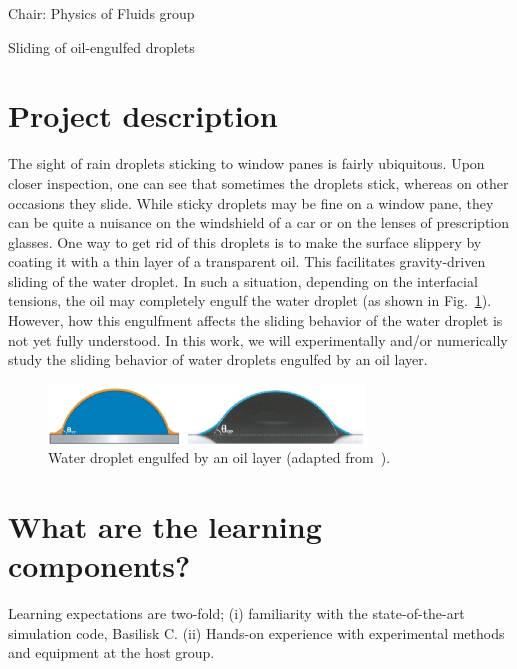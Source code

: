 \documentclass[a4paper,10pt]{article}
\begin{document}
 
\thispagestyle{empty} %

\noindent Chair: Physics of Fluids group
\begin{center}
 \begin{LARGE}
 Sliding of oil-engulfed droplets
 \end{LARGE}
\end{center}

\section*{Project description}
The sight of rain droplets sticking to window panes is fairly ubiquitous. Upon closer inspection, one can see that sometimes the droplets stick, whereas on other occasions they slide. While sticky droplets may be fine on a window pane, they can be quite a nuisance on the windshield of a car or on the lenses of prescription glasses. One way to get rid of this droplets is to make the surface slippery by coating it with a thin layer of a transparent oil. This facilitates gravity-driven sliding of the water droplet. In such a situation, depending on the interfacial tensions, the oil may completely engulf the water droplet (as shown in Fig.~\ref{figure}). However, how this engulfment affects the sliding behavior of the water droplet is not yet fully understood. In this work, we will experimentally and/or numerically study the sliding behavior of water droplets engulfed by an oil layer. 

\begin{figure}[h]
\centering
\includegraphics[width=0.75\textwidth]{engulfed_droplet.eps}
\caption{Water droplet engulfed by an oil layer (adapted from~\cite{li-2020-pnas}).}
\label{figure}
\end{figure}


\section*{What are the learning components?}
Learning expectations are two-fold; (i) familiarity with the state-of-the-art simulation code, Basilisk C. (ii) Hands-on experience with experimental methods and equipment at the host group.\\
\end{document}
